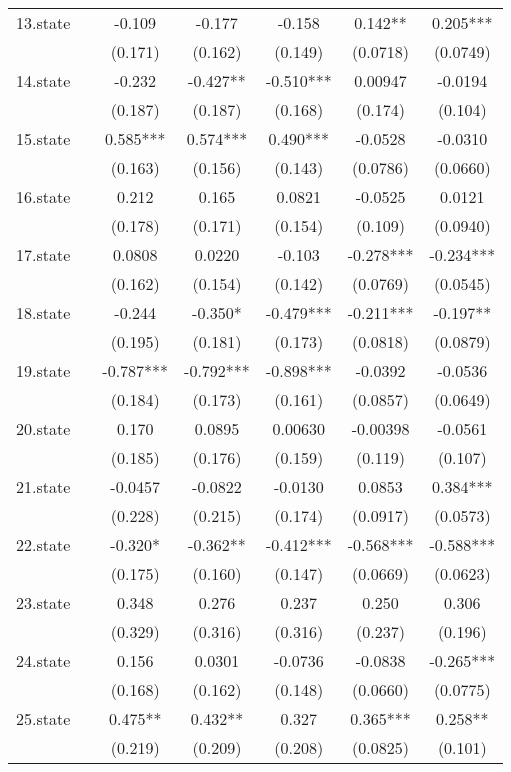 \documentclass[]{article}
\begin{document}
\begin{tabular}{lcccccc}
13.state &  & -0.109 & -0.177 & -0.158 & 0.142** & 0.205*** \\
 &  & (0.171) & (0.162) & (0.149) & (0.0718) & (0.0749) \\
14.state &  & -0.232 & -0.427** & -0.510*** & 0.00947 & -0.0194 \\
 &  & (0.187) & (0.187) & (0.168) & (0.174) & (0.104) \\
15.state &  & 0.585*** & 0.574*** & 0.490*** & -0.0528 & -0.0310 \\
 &  & (0.163) & (0.156) & (0.143) & (0.0786) & (0.0660) \\
16.state &  & 0.212 & 0.165 & 0.0821 & -0.0525 & 0.0121 \\
 &  & (0.178) & (0.171) & (0.154) & (0.109) & (0.0940) \\
17.state &  & 0.0808 & 0.0220 & -0.103 & -0.278*** & -0.234*** \\
 &  & (0.162) & (0.154) & (0.142) & (0.0769) & (0.0545) \\
18.state &  & -0.244 & -0.350* & -0.479*** & -0.211*** & -0.197** \\
 &  & (0.195) & (0.181) & (0.173) & (0.0818) & (0.0879) \\
19.state &  & -0.787*** & -0.792*** & -0.898*** & -0.0392 & -0.0536 \\
 &  & (0.184) & (0.173) & (0.161) & (0.0857) & (0.0649) \\
20.state &  & 0.170 & 0.0895 & 0.00630 & -0.00398 & -0.0561 \\
 &  & (0.185) & (0.176) & (0.159) & (0.119) & (0.107) \\
21.state &  & -0.0457 & -0.0822 & -0.0130 & 0.0853 & 0.384*** \\
 &  & (0.228) & (0.215) & (0.174) & (0.0917) & (0.0573) \\
22.state &  & -0.320* & -0.362** & -0.412*** & -0.568*** & -0.588*** \\
 &  & (0.175) & (0.160) & (0.147) & (0.0669) & (0.0623) \\
23.state &  & 0.348 & 0.276 & 0.237 & 0.250 & 0.306 \\
 &  & (0.329) & (0.316) & (0.316) & (0.237) & (0.196) \\
24.state &  & 0.156 & 0.0301 & -0.0736 & -0.0838 & -0.265*** \\
 &  & (0.168) & (0.162) & (0.148) & (0.0660) & (0.0775) \\
25.state &  & 0.475** & 0.432** & 0.327 & 0.365*** & 0.258** \\
 &  & (0.219) & (0.209) & (0.208) & (0.0825) & (0.101) \\

\end{tabular}
\end{document}
